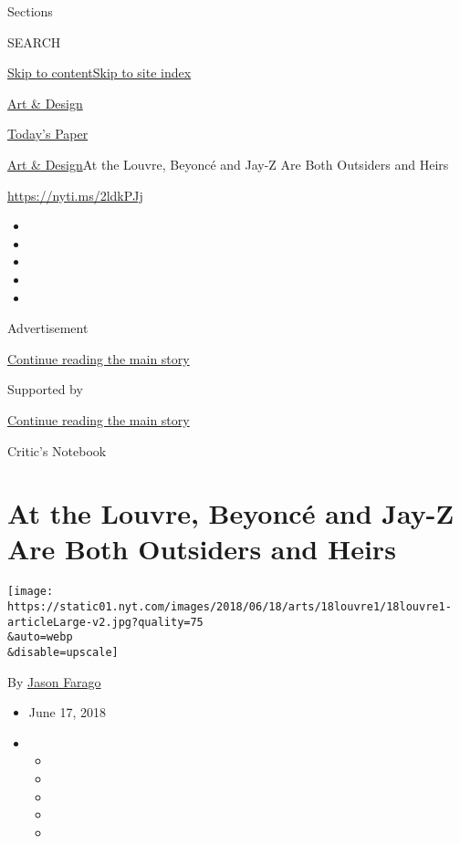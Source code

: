 Sections

SEARCH

\protect\hyperlink{site-content}{Skip to
content}\protect\hyperlink{site-index}{Skip to site index}

\href{https://www.nytimes.com/section/arts/design}{Art \& Design}

\href{https://myaccount.nytimes.com/auth/login?response_type=cookie\&client_id=vi}{}

\href{https://www.nytimes.com/section/todayspaper}{Today's Paper}

\href{/section/arts/design}{Art \& Design}\textbar{}At the Louvre,
Beyoncé and Jay-Z Are Both Outsiders and Heirs

\url{https://nyti.ms/2ldkPJj}

\begin{itemize}
\item
\item
\item
\item
\item
\end{itemize}

Advertisement

\protect\hyperlink{after-top}{Continue reading the main story}

Supported by

\protect\hyperlink{after-sponsor}{Continue reading the main story}

Critic's Notebook

\hypertarget{at-the-louvre-beyoncuxe9-and-jay-z-are-both-outsiders-and-heirs}{%
\section{At the Louvre, Beyoncé and Jay-Z Are Both Outsiders and
Heirs}\label{at-the-louvre-beyoncuxe9-and-jay-z-are-both-outsiders-and-heirs}}

\texttt{[image: https://static01.nyt.com/images/2018/06/18/arts/18louvre1/18louvre1-articleLarge-v2.jpg?quality=75\\\&auto=webp\\\&disable=upscale]}

By \href{https://www.nytimes.com/by/jason-farago}{Jason Farago}

\begin{itemize}
\item
  June 17, 2018
\item
  \begin{itemize}
  \item
  \item
  \item
  \item
  \item
  \end{itemize}
\end{itemize}

